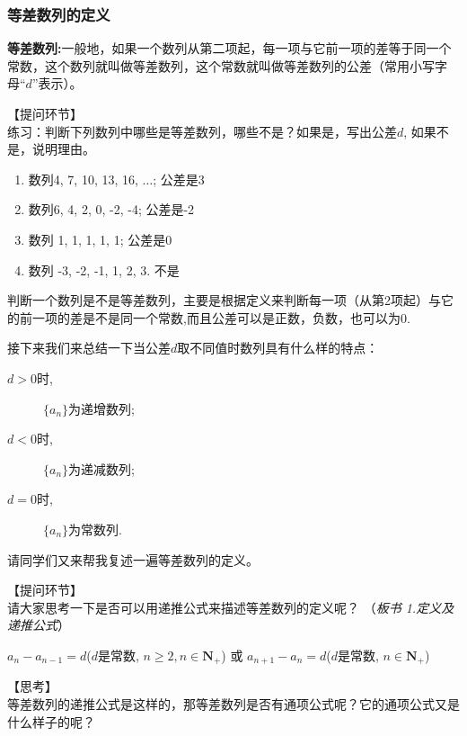 \documentclass[10pt,a4paper]{article}
\begin{document}
			\subsubsection{等差数列的定义}
			\textbf{等差数列:}一般地，如果一个数列从第二项起，每一项与它前一项的差等于同一个常数，这个数列就叫做等差数列，这个常数就叫做等差数列的公差（常用小写字母“$d$”表示）。

			【提问环节】\\
			练习：判断下列数列中哪些是等差数列，哪些不是？如果是，写出公差$d$, 如果不是，说明理由。 

			\begin{enumerate}
				\item 数列4, 7, 10, 13, 16, $\ldots$; \hspace{10pt} 公差是3
				\item 数列6, 4, 2, 0, -2, -4; \hspace{10pt} 公差是-2
				\item 数列 1, 1, 1, 1, 1; \hspace{10pt} 公差是0
				\item 数列 -3, -2, -1, 1, 2, 3. \hspace{10pt} 不是
			\end{enumerate}

			判断一个数列是不是等差数列，主要是根据定义来判断每一项（从第2项起）与它的前一项的差是不是同一个常数,而且公差可以是正数，负数，也可以为0.

			接下来我们来总结一下当公差$d$取不同值时数列具有什么样的特点： 

			\begin{description}
				\item[$d>0$时,] $\{a_n\}$为递增数列; 
				\item[$d<0$时,] $\{a_n\}$为递减数列; 
				\item[$d=0$时,] $\{a_n\}$为常数列. 
			\end{description}

			请同学们又来帮我复述一遍等差数列的定义。

			【提问环节】\\
			请大家思考一下是否可以用递推公式来描述等差数列的定义呢？ （\emph{板书 1.定义及递推公式}）

			$a_n-a_{n-1}=d$($d$是常数, $ n\geq 2, n\in \mathbf{N_+} $) 或 $a_{n+1}-a_{n}=d$($d$是常数, $ n\in \mathbf{N_+} $)

			【思考】\\
			等差数列的递推公式是这样的，那等差数列是否有通项公式呢？它的通项公式又是什么样子的呢？
\end{document}
